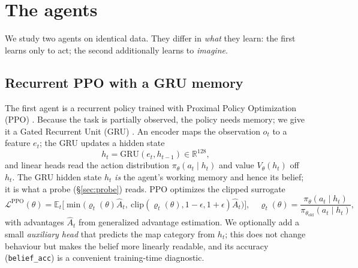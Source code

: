 \documentclass[11pt]{article}
\newcommand{\code}[1]{\texttt{\small #1}}
\newcommand{\R}{\mathbb{R}}
\newcommand{\E}{\mathbb{E}}
\begin{document}
\section{The agents}
\label{sec:agents}

We study two agents on identical data. They differ in \emph{what} they learn:
the first learns only to act; the second additionally learns to \emph{imagine}.

\subsection{Recurrent PPO with a GRU memory}
The first agent is a recurrent policy trained with Proximal Policy Optimization
(PPO) \cite{schulman2017proximal}. Because the task is partially observed, the
policy needs memory; we give it a Gated Recurrent Unit (GRU) \cite{cho2014gru}.
An encoder maps the observation $o_t$ to a feature $e_t$; the GRU updates a
hidden state
\begin{equation}
h_t = \mathrm{GRU}(e_t, h_{t-1}) \in \R^{128},
\end{equation}
and linear heads read the action distribution $\pi_\theta(a_t\mid h_t)$ and value
$V_\theta(h_t)$ off $h_t$. The GRU hidden state $h_t$ \emph{is} the agent's
working memory and hence its belief; it is what a probe (\S\ref{sec:probe})
reads. PPO optimizes the clipped surrogate
\begin{equation}
\mathcal{L}^{\text{PPO}}(\theta)=\E_t\Big[\min\big(\varrho_t(\theta)\hat A_t,\
\mathrm{clip}(\varrho_t(\theta),1-\epsilon,1+\epsilon)\hat A_t\big)\Big],\quad
\varrho_t(\theta)=\frac{\pi_\theta(a_t\mid h_t)}{\pi_{\theta_{\text{old}}}(a_t\mid h_t)},
\end{equation}
with advantages $\hat A_t$ from generalized advantage estimation. We optionally
add a small \emph{auxiliary head} that predicts the map category from $h_t$; this
does not change behaviour but makes the belief more linearly readable, and its
accuracy (\code{belief\_acc}) is a convenient training-time diagnostic.
\end{document}
